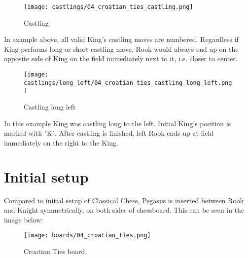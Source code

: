 \noindent
\begin{figure}[!h]
\texttt{[image: castlings/04\_croatian\_ties\_castling.png]}
\caption{Castling}
\label{fig:04_croatian_ties_castling}
\end{figure}

In example above, all valid King's castling moves are numbered. Regardless if King performs
long or short castling move, Rook would always end up on the opposite side of King on the
field immediately next to it, i.e. closer to center.

\noindent
\begin{figure}[!h]
\texttt{[image: castlings/long\_left/04\_croatian\_ties\_castling\_long\_left.png]}
\caption{Castling long left}
\label{fig:04_croatian_ties_castling_long_left}
\end{figure}

In this example King was castling long to the left. Initial King's position is marked with "K".
After castling is finished, left Rook ends up at field immediately on the right to the King.

\clearpage %

\section*{Initial setup}

Compared to initial setup of Classical Chess, Pegasus is inserted between Rook and Knight
symmetrically, on both sides of chessboard. This can be seen in the image below:

\noindent
\begin{figure}[h]
\texttt{[image: boards/04\_croatian\_ties.png]}
\caption{Croatian Ties board}
\label{fig:04_croatian_ties}
\end{figure}

\clearpage %
